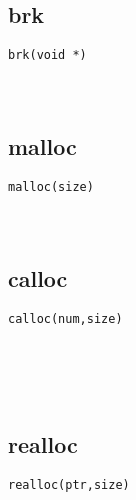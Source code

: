 \documentclass[10pt,a4paper]{article}
\begin{document}
\subsection{brk}
\begin{spacing}{2.0}
\lstset{language=C,numbers=none}
\begin{lstlisting}
brk(void *)
\end{lstlisting}
{\large\color[rgb]{0.2,0.4,0.6}{*:}}
\paragraph{ \ \ }
\end{spacing}

\subsection{malloc}
\begin{spacing}{2.0}
\lstset{language=C,numbers=none}
\begin{lstlisting}
malloc(size)
\end{lstlisting}
{\large\color[rgb]{0.2,0.4,0.6}{size:}}
\paragraph{ \ \ }
\end{spacing}

\subsection{calloc}
\begin{spacing}{2.0}
\lstset{language=C,numbers=none}
\begin{lstlisting}
calloc(num,size)
\end{lstlisting}
{\large\color[rgb]{0.2,0.4,0.6}{num:}} \\
{\large\color[rgb]{0.2,0.4,0.6}{size:}}
\paragraph{ \ \ }
\end{spacing}

\subsection{realloc}
\begin{spacing}{2.0}
\lstset{language=C,numbers=none}
\begin{lstlisting}
realloc(ptr,size)
\end{lstlisting}
{\large\color[rgb]{0.2,0.4,0.6}{ptr:}} \\
{\large\color[rgb]{0.2,0.4,0.6}{size:}}
\paragraph{ \ \ }
\end{spacing}
\end{document}
